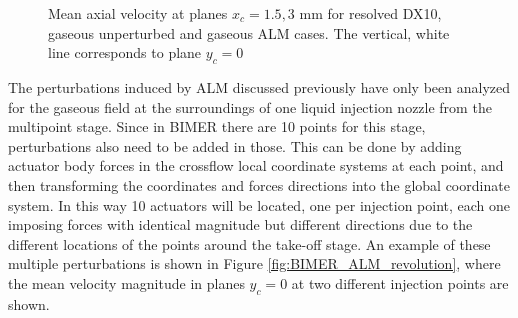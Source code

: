 \begin{figure}[h]
\centering
\caption[Mean axial velocity at planes $x_c = 1.5, 3$ mm for resolved DX10, gaseous unperturbed and gaseous ALM cases.]{Mean axial velocity at planes $x_c = 1.5, 3$ mm for resolved DX10, gaseous unperturbed and gaseous ALM cases. The vertical, white line corresponds to plane $y_c = 0$}
\label{fig:BIMER_LGS_turbulent_structures_planes_x}
\end{figure}

The perturbations induced by ALM discussed previously have only been analyzed for the gaseous field at the surroundings of one liquid injection nozzle from the multipoint stage. Since in BIMER there are 10 points for this stage, perturbations also need to be added in those. This can be done by adding actuator body forces in the crossflow local coordinate systems at each point, and then transforming the coordinates and forces directions into the global coordinate system. In this way 10 actuators will be located, one per injection point, each one imposing forces with identical magnitude but different directions due to the different locations of the points around the take-off stage. An example of these multiple perturbations is shown in Figure \ref{fig:BIMER_ALM_revolution}, where the mean velocity magnitude in planes $y_c = 0$ at two different injection points are shown.

\clearpage


